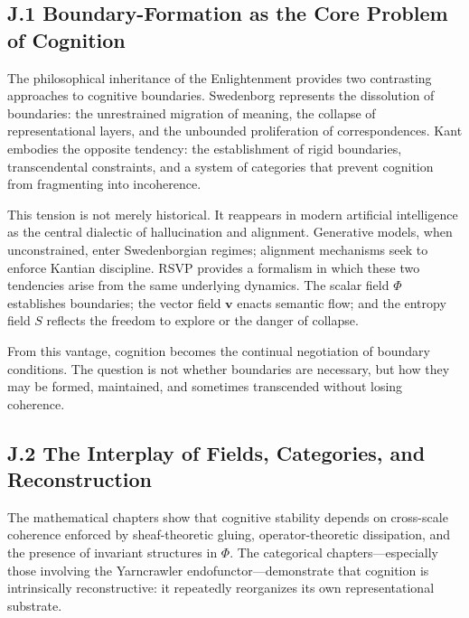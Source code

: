 \documentclass[12pt]{article}
\begin{document}
\subsection*{J.1 Boundary-Formation as the Core Problem of Cognition}

The philosophical inheritance of the Enlightenment provides two contrasting 
approaches to cognitive boundaries.  
Swedenborg represents the dissolution of boundaries: the unrestrained 
migration of meaning, the collapse of representational layers, and the 
unbounded proliferation of correspondences.  
Kant embodies the opposite tendency: the establishment of rigid boundaries, 
transcendental constraints, and a system of categories that prevent cognition 
from fragmenting into incoherence.

This tension is not merely historical.  
It reappears in modern artificial intelligence as the central dialectic of 
hallucination and alignment.  
Generative models, when unconstrained, enter Swedenborgian regimes; alignment 
mechanisms seek to enforce Kantian discipline.  
RSVP provides a formalism in which these two tendencies arise from the same 
underlying dynamics.  
The scalar field $\Phi$ establishes boundaries; the vector field $\mathbf{v}$ 
enacts semantic flow; and the entropy field $S$ reflects the freedom to 
explore or the danger of collapse.

From this vantage, cognition becomes the continual negotiation of boundary 
conditions.  
The question is not whether boundaries are necessary, but how they may be 
formed, maintained, and sometimes transcended without losing coherence.

\subsection*{J.2 The Interplay of Fields, Categories, and Reconstruction}

The mathematical chapters show that cognitive stability depends on 
cross-scale coherence enforced by sheaf-theoretic gluing, operator-theoretic 
dissipation, and the presence of invariant structures in $\Phi$.  
The categorical chapters—especially those involving the Yarncrawler 
endofunctor—demonstrate that cognition is intrinsically reconstructive: it 
repeatedly reorganizes its own representational substrate.
\end{document}
